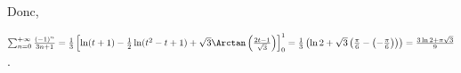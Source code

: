 {{ 
Donc, 

\begin{center}
$\sum_{n=0}^{+\infty}\frac{(-1)^n}{3n+1}=\frac{1}{3}\left[\ln(t+1)-\frac{1}{2}\ln(t^2-t+1)+\sqrt{3}\Arctan\left(\frac{2t-1}{\sqrt{3}}\right)\right]_0^1=\frac{1}{3}\left(\ln2+\sqrt{3}\left(\frac{\pi}{6}-\left(-\frac{\pi}{6}\right)\right)\right)=\frac{3\ln2+\pi\sqrt{3}}{9}$.
\end{center}

\begin{center}
\end{center}
}
}
